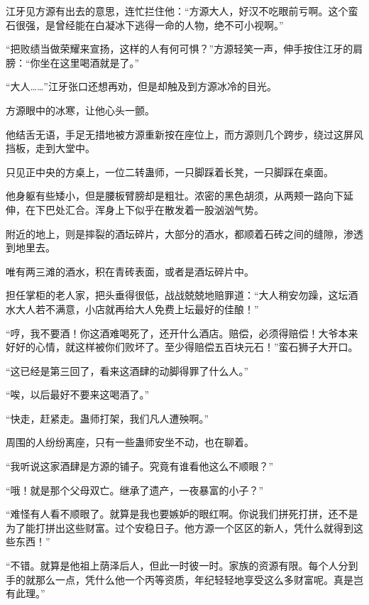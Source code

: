 
\begin{this_body}

江牙见方源有出去的意思，连忙拦住他：“方源大人，好汉不吃眼前亏啊。这个蛮石很强，是曾经能在白凝冰下逃得一命的人物，绝不可小视啊。”

“把败绩当做荣耀来宣扬，这样的人有何可惧？”方源轻笑一声，伸手按住江牙的肩膀：“你坐在这里喝酒就是了。”

“大人……”江牙张口还想再劝，但是却触及到方源冰冷的目光。

方源眼中的冰寒，让他心头一颤。

他结舌无语，手足无措地被方源重新按在座位上，而方源则几个跨步，绕过这屏风挡板，走到大堂中。

只见正中央的方桌上，一位二转蛊师，一只脚踩着长凳，一只脚踩在桌面。

他身躯有些矮小，但是腰板臂膀却是粗壮。浓密的黑色胡须，从两颊一路向下延伸，在下巴处汇合。浑身上下似乎在散发着一股汹汹气势。

附近的地上，则是摔裂的酒坛碎片，大部分的酒水，都顺着石砖之间的缝隙，渗透到地里去。

唯有两三滩的酒水，积在青砖表面，或者是酒坛碎片中。

担任掌柜的老人家，把头垂得很低，战战兢兢地赔罪道：“大人稍安勿躁，这坛酒水大人若不满意，小店就再给大人免费上坛最好的佳酿！”

“哼，我不要酒！你这酒难喝死了，还开什么酒店。赔偿，必须得赔偿！大爷本来好好的心情，就这样被你们败坏了。至少得赔偿五百块元石！”蛮石狮子大开口。

“这已经是第三回了，看来这酒肆的动脚得罪了什么人。”

“唉，以后最好不要来这喝酒了。”

“快走，赶紧走。蛊师打架，我们凡人遭殃啊。”

周围的人纷纷离座，只有一些蛊师安坐不动，也在聊着。

“我听说这家酒肆是方源的铺子。究竟有谁看他这么不顺眼？”

“哦！就是那个父母双亡。继承了遗产，一夜暴富的小子？”

“难怪有人看不顺眼了。就算是我也要嫉妒的眼红啊。你说我们拼死打拼，还不是为了能打拼出这些财富。过个安稳日子。他方源一个区区的新人，凭什么就得到这些东西！”

“不错。就算是他祖上荫泽后人，但此一时彼一时。家族的资源有限。每个人分到手的就那么一点，凭什么他一个丙等资质，年纪轻轻地享受这么多财富呢。真是岂有此理。”


\end{this_body}
